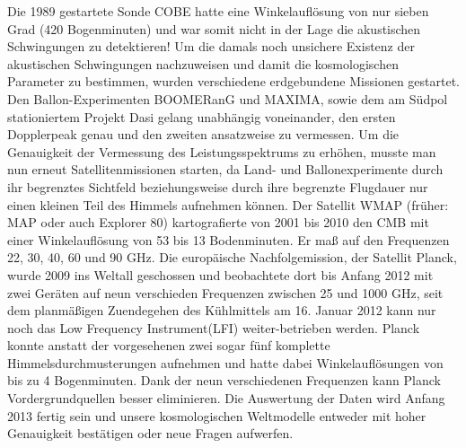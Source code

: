 \documentclass[10pt,a4paper]{article}
\begin{document}
Die 1989 gestartete Sonde COBE hatte eine Winkelauflösung von nur sieben Grad (420 Bogenminuten) und war somit nicht in der Lage die akustischen Schwingungen zu detektieren! Um die damals noch unsichere Existenz der akustischen Schwingungen nachzuweisen und damit die kosmologischen Parameter zu bestimmen, wurden verschiedene erdgebundene Missionen gestartet. Den Ballon-Experimenten BOOMERanG und MAXIMA, sowie dem am Südpol stationiertem Projekt Dasi gelang unabhängig voneinander, den ersten Dopplerpeak genau und den zweiten ansatzweise zu vermessen. Um die Genauigkeit der Vermessung des Leistungsspektrums zu erhöhen, musste man nun erneut Satellitenmissionen starten, da Land- und Ballonexperimente durch ihr begrenztes Sichtfeld beziehungsweise durch ihre begrenzte Flugdauer nur einen kleinen Teil des Himmels aufnehmen können.
Der Satellit WMAP (früher: MAP oder auch Explorer 80) kartografierte von 2001 bis 2010 den CMB mit einer Winkelauflösung von 53 bis 13 Bodenminuten.\cite{PJ1} Er maß auf den Frequenzen 22, 30, 40, 60 und 90 GHz.
Die europäische Nachfolgemission, der Satellit Planck, wurde 2009 ins Weltall geschossen und beobachtete dort bis Anfang 2012 mit zwei Geräten auf neun verschieden Frequenzen zwischen 25 und 1000 GHz, seit dem planmäßigen Zuendegehen des Kühlmittels am 16. Januar 2012 kann nur noch das \glqq Low Frequency Instrument\grqq (LFI) weiter-betrieben werden\cite{PJ1}\cite{pm}.
Planck konnte anstatt der vorgesehenen zwei sogar fünf komplette Himmelsdurchmusterungen aufnehmen und hatte dabei Winkelauflösungen von bis zu 4 Bogenminuten. %
Dank der neun verschiedenen Frequenzen kann Planck Vordergrundquellen besser eliminieren. Die Auswertung der Daten wird Anfang 2013 fertig sein und unsere kosmologischen Weltmodelle entweder mit hoher Genauigkeit bestätigen oder neue Fragen aufwerfen.

\newpage
{}

\end{document}
